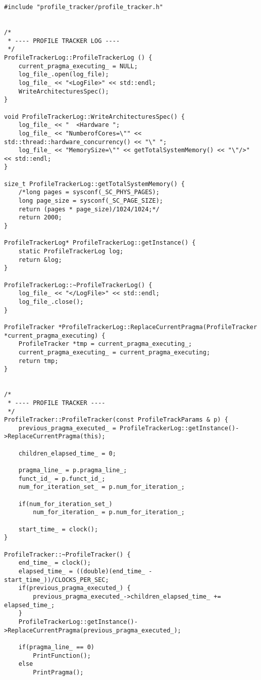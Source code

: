 \documentclass[a4paper,10pt,twoside]{book}
\begin{document}
\begin{lstlisting}[language=CCC, caption=profile\_tracker.cpp]
#include "profile_tracker/profile_tracker.h"


/*
 * ---- PROFILE TRACKER LOG ----
 */
ProfileTrackerLog::ProfileTrackerLog () {
	current_pragma_executing_ = NULL;
	log_file_.open(log_file);
	log_file_ << "<LogFile>" << std::endl;
	WriteArchitecturesSpec();
}

void ProfileTrackerLog::WriteArchitecturesSpec() {
	log_file_ << "	<Hardware ";
	log_file_ << "NumberofCores=\"" << std::thread::hardware_concurrency() << "\" ";
  	log_file_ << "MemorySize=\"" << getTotalSystemMemory() << "\"/>" << std::endl;
}	

size_t ProfileTrackerLog::getTotalSystemMemory() {
   	/*long pages = sysconf(_SC_PHYS_PAGES);
   	long page_size = sysconf(_SC_PAGE_SIZE);
   	return (pages * page_size)/1024/1024;*/
   	return 2000;
}

ProfileTrackerLog* ProfileTrackerLog::getInstance() {
    static ProfileTrackerLog log;
    return &log;
}

ProfileTrackerLog::~ProfileTrackerLog() {
	log_file_ << "</LogFile>" << std::endl;
	log_file_.close();
}

ProfileTracker *ProfileTrackerLog::ReplaceCurrentPragma(ProfileTracker *current_pragma_executing) {
	ProfileTracker *tmp = current_pragma_executing_;
	current_pragma_executing_ = current_pragma_executing;
	return tmp;
}


/* 
 * ---- PROFILE TRACKER ----
 */
ProfileTracker::ProfileTracker(const ProfileTrackParams & p) {
	previous_pragma_executed_ = ProfileTrackerLog::getInstance()->ReplaceCurrentPragma(this);

	children_elapsed_time_ = 0;	

	pragma_line_ = p.pragma_line_;
	funct_id_ = p.funct_id_;
	num_for_iteration_set_ = p.num_for_iteration_;

	if(num_for_iteration_set_)
		num_for_iteration_ = p.num_for_iteration_;

	start_time_ = clock();
}

ProfileTracker::~ProfileTracker() {
	end_time_ = clock();
	elapsed_time_ = ((double)(end_time_ - start_time_))/CLOCKS_PER_SEC;
	if(previous_pragma_executed_) {
		previous_pragma_executed_->children_elapsed_time_ += elapsed_time_;
	}	
	ProfileTrackerLog::getInstance()->ReplaceCurrentPragma(previous_pragma_executed_);

	if(pragma_line_ == 0)
		PrintFunction();
	else
		PrintPragma();


\end{lstlisting}
\end{document}

